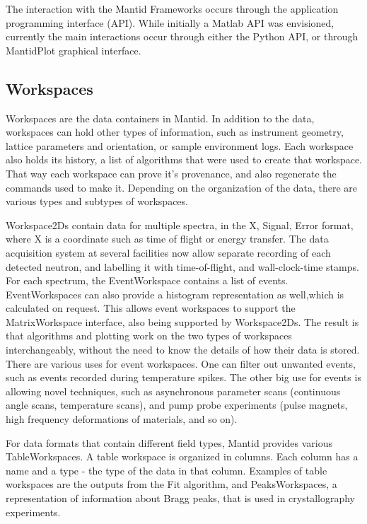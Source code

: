 \documentclass{elsarticle}
\begin{document}
The interaction with the Mantid Frameworks occurs through the application programming interface (API). While initially a Matlab API was envisioned, currently the main interactions occur through either the Python API, or through MantidPlot graphical interface. 


\subsection{Workspaces}
Workspaces are the data containers in Mantid. In addition to the data, workspaces can hold other types of information, such as instrument geometry, lattice parameters and orientation, or sample environment logs. Each workspace also holds its history, a list of algorithms that were used to create that workspace. That way each workspace can prove it's provenance, and also regenerate the commands used to make it. Depending on the organization of the data, there are various types and subtypes of workspaces.

Workspace2Ds contain data for multiple spectra, in the X, Signal, Error format, where X is a coordinate such as time of flight or energy transfer. The data acquisition system at several facilities now allow separate recording of each  detected neutron, and labelling it with time-of-flight, and wall-clock-time stamps. For each spectrum, the EventWorkspace contains a list of events. EventWorkspaces can also provide a histogram representation as well,which is calculated on request. This allows event workspaces to support the MatrixWorkspace interface, also being supported by Workspace2Ds. The result is that algorithms and plotting work on the two types of workspaces interchangeably, without the need to know the details of how their data is stored. 
There are various uses for event workspaces. One can filter out unwanted events, such as events recorded during temperature spikes. The other big use for events is allowing novel techniques, such as asynchronous parameter scans (continuous angle scans, temperature scans), and pump probe experiments (pulse magnets, high frequency deformations of materials, and so on).

For data formats that contain different field types, Mantid provides various TableWorkspaces. A table workspace is organized in columns. Each column has a name and a type - the type of the data in that column. Examples of table workspaces are the outputs from the Fit algorithm, and PeaksWorkspaces, a representation of information about Bragg peaks, that is used in crystallography experiments.
 
\end{document}
